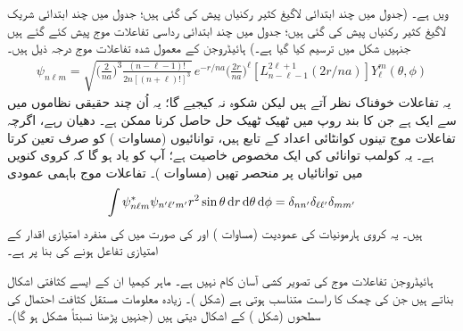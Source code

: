   ویں  ہے۔ (جدول  میں چند ابتدائی لاگیغ کثیر رکنیاں پیش کی گئی ہیں؛ جدول  میں چند ابتدائی شریک لاگیغ کثیر رکنیاں پیش کی گئی ہیں؛ جدول  میں چند ابتدائی رداسی تفاعلات موج پیش کئے گئے ہیں جنہیں شکل  میں ترسیم کیا گیا ہے۔) ہائیڈروجن کے معمول شدہ تفاعلات موج درجہ ذیل ہیں۔
 \begin{align}\label{مساوات_تین_ابعادی_ہائیڈروجن_تفاعلات_موج}
\psi_{n\ell m}=\sqrt{\big(\frac{2}{na}\big)^3\frac{(n-\ell-1)!}{2n[(n+\ell)!]^{3}}}\,e^{-r/na}\big(\frac{2r}{na}\big)^{\ell}[L_{n-\ell-1}^{2\ell+1}(2r/na)]Y_{\ell}^{m}(\theta,\phi)
\end{align}
یہ تفاعلات خوفناک نظر آتے ہیں لیکن شکوہ نہ کیجیے گا؛ یہ اُن چند حقیقی نظاموں میں سے ایک ہے جن کا بند روپ میں ٹھیک ٹھیک حل حاصل کرنا ممکن ہے۔ دھیان رہے، اگرچہ تفاعلات موج تینوں کوانٹائی اعداد کے تابع ہیں، توانائیوں (مساوات ) کو صرف  تعین کرتا ہے۔ یہ کولمب توانائی کی ایک مخصوص خاصیت ہے؛ آپ کو یاد ہو گا کہ کروی کنویں میں توانائیاں  پر منحصر تھیں (مساوات )۔ تفاعلات موج باہمی عمودی 
\begin{align}
\int\psi_{n\ell m}^{*}\psi_{n'\ell'm'}r^{2}\sin\theta\dif r\dif\theta\dif\phi=\delta_{nn'}\delta_{\ell \ell'}\delta_{mm'} 
\end{align}
ہیں۔ یہ کروی ہارمونیات کی عمودیت (مساوات ) اور  کی صورت میں  کی منفرد امتیازی اقدار کے امتیازی تفاعل ہونے کی بنا پر ہے۔

ہائیڈروجن تفاعلات موج کی تصویر کشی آسان کام نہیں ہے۔ ماہر کیمیا ان کے ایسے کثافتی اشکال بناتے ہیں جن کی چمک  کا راست متناسب ہوتی ہے (شکل )۔ زیادہ معلومات مستقل کثافت احتمال کی سطحوں (شکل ) کے اشکال دیتی ہیں (جنہیں پڑھنا نسبتاً مشکل ہو گا)۔


